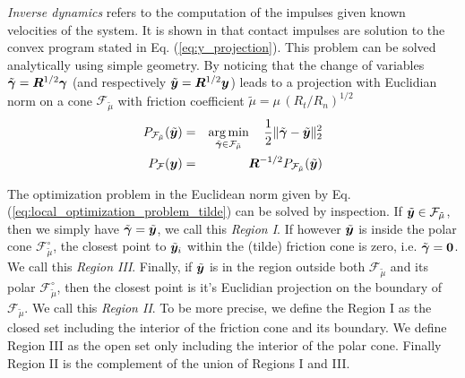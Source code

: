
\textit{Inverse dynamics} refers to the computation of the impulses given known
velocities of the system. It is shown in \cite{bib:todorov2014} that contact
impulses are solution to the convex program stated in Eq.
(\ref{eq:y_projection}). This problem can be solved analytically using simple
geometry. By noticing that the change of variables
$\tilde{{\bm\gamma}}={\bm{R}}^{1/2}{\bm\gamma}$ (and respectively
$\tilde{{\bm{y}}}={\bm{R}}^{1/2}{\bm{y}}$) leads to a projection with Euclidian norm
on a cone $\mathcal{F}_{\tilde\mu}$ with friction coefficient
$\tilde\mu=\mu\,(R_t/R_n)^{1/2}$
\begin{eqnarray}
	P_\mathcal{F_{\tilde\mu}}(\tilde{\vf{y}})&=&\argmin_{\tilde\bgamma\in\mathcal{F_{\tilde\mu}}}
		\quad \frac{1}{2}\Vert\tilde\bgamma-\tilde{\vf{y}}\Vert_2^2\nonumber\\
	P_\mathcal{F}(\vf{y}) &=&
	\vf{R}^{-1/2}P_\mathcal{F_{\tilde\mu}}(\tilde{\vf{y}})
	\label{eq:local_optimization_problem_tilde}
\end{eqnarray}

The optimization problem in the Euclidean norm given by Eq.
(\ref{eq:local_optimization_problem_tilde}) can be solved by inspection. If
$\tilde{{\bm{y}}}\in\mathcal{F}_{\tilde\mu}$, then we simply have $\tilde{{\bm\gamma}}
= \tilde{{\bm{y}}}$, we call this \textit{Region I}. If however $\tilde{{\bm{y}}}$
is inside the polar cone $\mathcal{F}_{\tilde\mu}^\circ$, the closest point to
$\tilde{{\bm{y}}}_i$ within the (tilde) friction cone is zero, i.e.
$\tilde{{\bm\gamma}} ={\bm{0}}$. We call this \textit{Region III}. Finally, if
$\tilde{{\bm{y}}}$ is in the region outside both $\mathcal{F}_{\tilde\mu}$ and its
polar $\mathcal{F}_{\tilde\mu}^\circ$, then the closest point is it's Euclidian
projection on the boundary of $\mathcal{F}_{\tilde\mu}$. We call this
\textit{Region II}. To be more precise, we define the Region I as the closed set
including the interior of the friction cone and its boundary. We define Region
III as the open set only including the interior of the polar cone. Finally
Region II is the complement of the union of Regions I and III.

